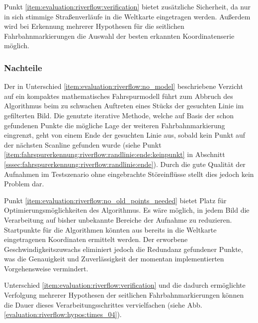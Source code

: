 Punkt \ref{item:evaluation:riverflow:verification} bietet zusätzliche Sicherheit, da nur in sich stimmige Straßenverläufe in die Weltkarte eingetragen werden. Außerdem wird bei Erkennung mehrerer Hypothesen für die seitlichen Fahrbahnmarkierungen die Auswahl der besten erkannten Koordinatenserie möglich.

\subsubsection{Nachteile}
\label{ssec:evaluation:riverflow:diskussion_prinzip:nachteile}
Der in Unterschied \ref{item:evaluation:riverflow:no_model} beschriebene Verzicht auf ein kompaktes mathematisches Fahrspurmodell führt zum Abbruch des Algorithmus beim zu schwachen Auftreten eines Stücks der gesuchten Linie im gefilterten Bild. Die genutzte iterative Methode, welche auf Basis der schon gefundenen Punkte die mögliche Lage der weiteren Fahrbahnmarkierung eingrenzt, geht von einem Ende der gesuchten Linie aus, sobald kein Punkt auf der nächsten Scanline gefunden wurde (siehe Punkt \ref{item:fahrspurerkennung:riverflow:randlinie:ende:keinpunkt} in Abschnitt \ref{sssec:fahrspurerkennung:riverflow:randlinie:ende}). Durch die gute Qualität der Aufnahmen im Testszenario ohne eingebrachte Störeinflüsse stellt dies jedoch kein  Problem dar.

Punkt \ref{item:evaluation:riverflow:no_old_points_needed} bietet Platz für Optimierungsmöglichkeiten des Algorithmus. Es wäre möglich, in jedem Bild die Verarbeitung auf bisher unbekannte Bereiche der Aufnahme zu reduzieren. Startpunkte für die Algorithmen könnten aus bereits in die Weltkarte eingetragenen Koordinaten ermittelt werden. Der erworbene Geschwindigkeitszuwachs eliminiert jedoch die Redundanz gefundener Punkte, was die Genauigkeit und Zuverlässigkeit der momentan implementierten Vorgehensweise vermindert.

Unterschied \ref{item:evaluation:riverflow:verification} und die dadurch ermöglichte Verfolgung mehrerer Hypothesen der seitlichen Fahrbahnmarkierungen können die Dauer dieses Verarbeitungsschrittes vervielfachen (siehe Abb. \ref{evaluation:riverflow:hypos:times_04}).
